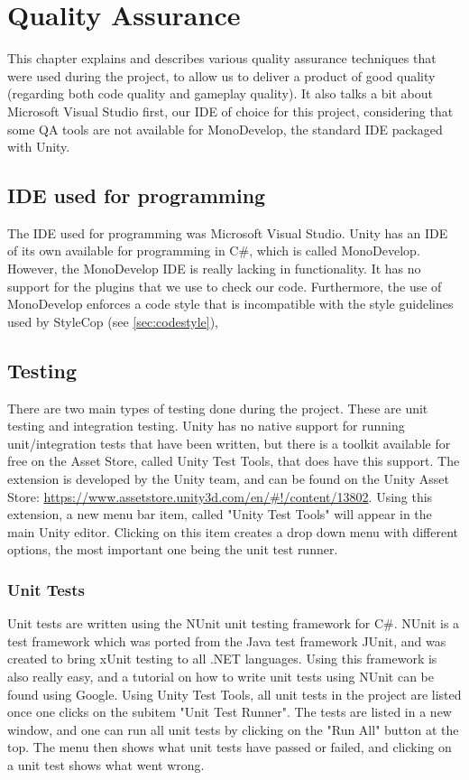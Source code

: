 \chapter{Quality Assurance} \label{cha:qa}
	This chapter explains and describes various quality assurance techniques 
	that were used during the project, to allow us to deliver a product of 
	good quality (regarding both code quality and gameplay quality). It also
	talks a bit about Microsoft Visual Studio first, our IDE of choice for
	this project, considering that some QA tools are not available for
	MonoDevelop, the standard IDE packaged with Unity.
	
	\section{IDE used for programming} \label{sec:ide}
		The IDE used for programming was Microsoft Visual Studio. Unity has an IDE
		of its own available for programming in C\#, which is called MonoDevelop.
		However, the MonoDevelop IDE is really lacking in functionality. It has no
		support for the plugins that we use to check our code. Furthermore, the use
		of MonoDevelop enforces a code style that is incompatible with the style 
		guidelines used by StyleCop (see \ref{sec:codestyle}), 
	
	\section{Testing} \label{sec:testing}
		There are two main types of testing done during the project. These are
		unit testing and integration testing. Unity has no native support for
		running unit\slash integration tests that have been written, but there is 
		a toolkit available for free on the Asset Store, called Unity Test Tools, 
		that does have this support. The extension is developed by the Unity team, 
		and can be found on the Unity Asset Store: 
		\url{https://www.assetstore.unity3d.com/en/#!/content/13802}.
		Using this extension, a new menu bar item, called "Unity Test Tools"
		will appear in the main Unity editor. Clicking on this item creates a drop
		down menu with different options, the most important one being the unit test
		runner.
		
		\subsection{Unit Tests} \label{ssec:unittests)}
			Unit tests are written using the NUnit unit testing framework for 
			C\#. NUnit is a test framework which was ported from the Java test 
			framework JUnit, and was created to bring xUnit testing to all .NET 
			languages. Using this framework is also really easy, and a tutorial 
			on how to write unit tests using NUnit can be found using Google. 
			Using Unity Test Tools, all unit tests in the project are listed 
			once one clicks on the subitem "Unit Test Runner". The tests are 
			listed in a new window, and one can run all unit tests by clicking 
			on the "Run All" button at the top. The menu then shows what unit 
			tests have passed or failed, and clicking on a unit test shows what 
			went wrong.
		
